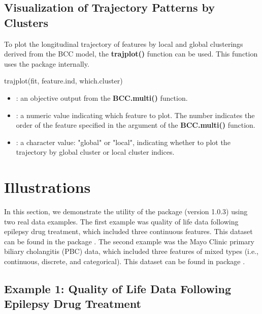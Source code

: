 \subsection{Visualization of Trajectory Patterns by Clusters}

To plot the longitudinal trajectory of features by local and global clusterings derived from the BCC model, the \textbf{trajplot()} function can be used. This function uses the  package internally. 

\begin{example}
trajplot(fit, feature.ind, which.cluster)
\end{example}

\begin{itemize}

	\item {}: an objective output from the \textbf{BCC.multi()} function.  

	\item {}: a numeric value indicating which feature to plot. The number indicates the order of the feature specified in the  argument of the \textbf{BCC.multi()} function.

	\item {}:  a character value: "global" or "local", indicating whether to plot the trajectory by global cluster or local cluster indices. 

\end{itemize}

\section{Illustrations} \label{sec:illustrations}

In this section, we demonstrate the utility of the  package (version 1.0.3) using two real data examples. The first example was quality of life data following epilepsy drug treatment, which included three continuous features. This dataset can be found in the  package \citep{Hickey2018}. The second example was the Mayo Clinic primary biliary cholangitis (PBC) data, which included three features of mixed types (i.e., continuous, discrete, and categorical).  This dataset can be found in  package \citep{Komarek2014}.

\subsection{Example 1: Quality of Life Data Following Epilepsy Drug Treatment}

